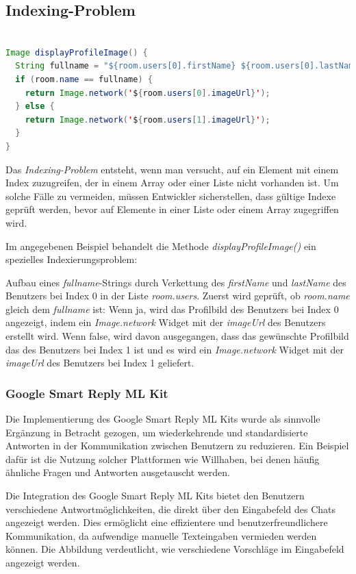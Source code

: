 \subsection{Indexing-Problem}

\begin{lstlisting}[language=Java,caption=Anzeige des Profilbildes,label=lst:fotoSelektion]  

Image displayProfileImage() {
  String fullname = "${room.users[0].firstName} ${room.users[0].lastName}";
  if (room.name == fullname) {
    return Image.network('${room.users[0].imageUrl}');
  } else {
    return Image.network('${room.users[1].imageUrl}');
  }
}

\end{lstlisting}

Das \textit{Indexing-Problem} entsteht, wenn man versucht, auf ein Element mit einem Index zuzugreifen, der in einem Array oder einer Liste nicht vorhanden ist. Um solche Fälle zu vermeiden, müssen Entwickler sicherstellen, dass gültige Indexe geprüft werden, bevor auf Elemente in einer Liste oder einem Array zugegriffen wird.

Im angegebenen Beispiel behandelt die Methode \textit{displayProfileImage()} ein spezielles Indexierungsproblem:

Aufbau eines \textit{fullname}-Strings durch Verkettung des \textit{firstName} und \textit{lastName} des Benutzers bei Index 0 in der Liste \textit{room.users}.
Zuerst wird geprüft, ob \textit{room.name} gleich dem \textit{fullname} ist:
Wenn ja, wird das Profilbild des Benutzers bei Index 0 angezeigt, indem ein \textit{Image.network} Widget mit der \textit{imageUrl} des Benutzers erstellt wird.
Wenn false, wird davon ausgegangen, dass das gewünschte Profilbild das des Benutzers bei Index 1 ist und es wird ein \textit{Image.network} Widget mit der \textit{imageUrl} des Benutzers bei Index 1 geliefert.

\subsubsection{Google Smart Reply ML Kit}
Die Implementierung des Google Smart Reply ML Kits wurde als sinnvolle Ergänzung in Betracht gezogen, um wiederkehrende und standardisierte Antworten in der Kommunikation zwischen Benutzern zu reduzieren. Ein Beispiel dafür ist die Nutzung solcher Plattformen wie Willhaben, bei denen häufig ähnliche Fragen und Antworten ausgetauscht werden.

Die Integration des Google Smart Reply ML Kits bietet den Benutzern verschiedene Antwortmöglichkeiten, die direkt über den Eingabefeld des Chats angezeigt werden. Dies ermöglicht eine effizientere und benutzerfreundlichere Kommunikation, da aufwendige manuelle Texteingaben vermieden werden können. Die Abbildung verdeutlicht, wie verschiedene Vorschläge im Eingabefeld angezeigt werden.

